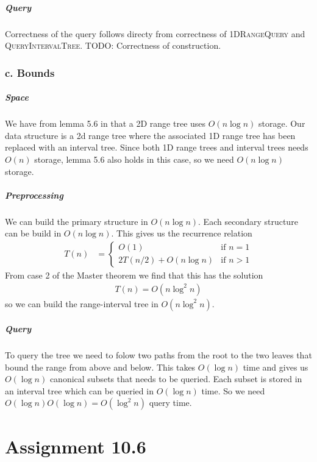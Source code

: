 \documentclass[10pt,a4paper,final,oneside,openany,article]{memoir}
\newcommand{\twopartdef}[4] {
  \left\{
    \begin{array}{ll}
      #1 & \mbox{if } #2 \\
      {#3} & \mbox{if } #4
    \end{array}
  \right.
}
\begin{document}
\paragraph{Query}
Correctness of the query follows directy from correctness of \textsc{ 1DRangeQuery} and \textsc{ QueryIntervalTree}. TODO: Correctness of construction.


\subsection*{c. Bounds}
\paragraph{Space}We have from lemma 5.6 in \cite{deBerg} that a 2D range tree uses $O(n \log n)$ storage. Our data structure is a 2d range tree where the associated 1D range tree has been replaced with an interval tree. Since both 1D range trees and interval trees needs $O(n)$ storage, lemma 5.6 also holds in this case, so we need $O(n \log n)$ storage.

\paragraph{Preprocessing}
We can build the primary structure in $O(n \log n)$. Each secondary structure can be build in $O(n \log n)$. This gives us the recurrence relation
\begin{align*}
  T(n) &= \twopartdef{O(1)}{n = 1}{2T(n/2) + O(n \log n)}{n > 1}
\end{align*}
From case 2 of the Master theorem we find that this has the solution
\begin{align*}
  T(n) = O(n \log^2 n)
\end{align*}
so we can build the range-interval tree in $O(n \log^2 n)$.

\paragraph{Query}
To query the tree we need to folow two paths from the root to the two leaves that bound the range from above and below. This takes $O(\log n)$ time and gives us $O(\log n)$ canonical subsets that needs to be queried. Each subset is stored in an interval tree which can be queried in $O(\log n)$ time. So we need $O(\log n)O(\log n) = O(\log^2 n)$ query time.




\chapter*{Assignment 10.6}
\end{document}
